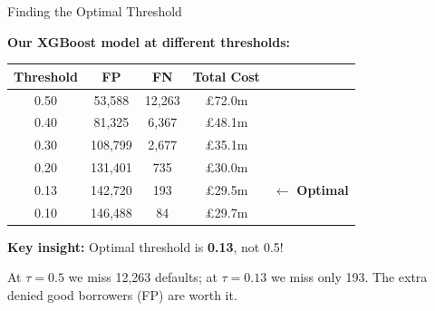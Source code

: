 \documentclass[10pt]{beamer}
\newcommand{\highlight}[1]{\textcolor{AccentOrange}{\textbf{#1}}}
\begin{document}
\begin{frame}{Finding the Optimal Threshold}

  \textbf{Our XGBoost model at different thresholds:}

  \vspace{0.5em}
  \begin{center}
  \begin{tabular}{ccccc}
    \toprule
    \textbf{Threshold} & \textbf{FP} & \textbf{FN} & \textbf{Total Cost} & \\
    \midrule
    0.50 & 53,588 & 12,263 & \pounds 72.0m & \\
    0.40 & 81,325 & 6,367 & \pounds 48.1m & \\
    0.30 & 108,799 & 2,677 & \pounds 35.1m & \\
    0.20 & 131,401 & 735 & \pounds 30.0m & \\
    0.13 & 142,720 & 193 & \pounds 29.5m & $\longleftarrow$ \textbf{Optimal} \\
    0.10 & 146,488 & 84 & \pounds 29.7m & \\
    \bottomrule
  \end{tabular}
  \end{center}

  \vspace{0.5em}
  \textbf{Key insight:} Optimal threshold is \highlight{0.13}, not 0.5!

  \vspace{0.3em}
  At $\tau = 0.5$ we miss 12,263 defaults; at $\tau = 0.13$ we miss only 193. The extra denied good borrowers (FP) are worth it.
\end{frame}

\end{document}
